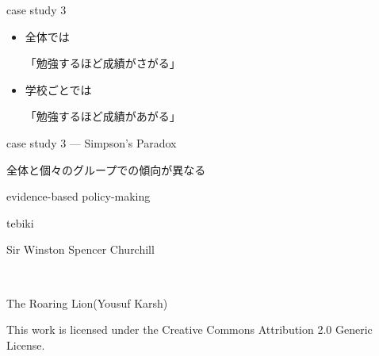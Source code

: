 \documentclass[
  ignorenonframetext,
]{beamer}
\begin{document}
\begin{frame}{case study 3}
\protect\hypertarget{case-study-3-9}{}
\LARGE

\begin{itemize}
\item[\textbullet] 全体では\par
「勉強するほど成績がさがる」
\bigskip\pause
\item[\textbullet] 学校ごとでは\par
「勉強するほど成績があがる」
\end{itemize}
\end{frame}

\begin{frame}{case study 3 --- Simpson's Paradox}
\protect\hypertarget{case-study-3-simpsons-paradox}{}
\LARGE

全体と個々のグループでの傾向が異なる

\normalsize
\end{frame}

\begin{frame}{evidence-based policy-making}
\protect\hypertarget{evidence-based-policy-making-2}{}
\Huge

\raggedleft
\scalebox{2}{\textcolor{softblue}{データ}}\scalebox{1.2}{に基づき}

\scalebox{2}{\textcolor{lightpurple}{根拠}}\scalebox{1.2}{を持って}

\scalebox{1.2}{仕事を前に進めよう!}
\end{frame}

\begin{frame}{tebiki}
\protect\hypertarget{tebiki}{}
\vspace*{-20pt}
\end{frame}

\begin{frame}{Sir Winston Spencer Churchill}
\protect\hypertarget{sir-winston-spencer-churchill}{}
\raggedleft\Huge


\tiny

\raggedleft

The Roaring Lion(Yousuf Karsh) \vspace{-5pt}

This work is licensed under the Creative Commons Attribution 2.0 Generic
License.
\end{frame}
\end{document}
